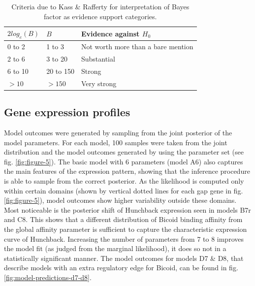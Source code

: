 \begin{table}[h]
\centering
\begin{tabular}{lll}
\hline
$2log_{e}(B)$ & $B$ & Evidence against $H_0$ \\ \hline
0 to 2 & 1 to 3 & Not worth more than a bare mention \\
2 to 6 & 3 to 20 & Substantial                      \\
6 to 10 & 20 to 150 & Strong                      \\
$> 10$ & $> 150$ & Very strong                      \\ \hline
\end{tabular}
\vspace{0.25in}
\caption{Criteria due to Kass \& Rafferty \cite{raftery95} for interpretation of Bayes factor as evidence support categories.}
\label{table2}
\end{table}

\subsection{Gene expression profiles}
Model outcomes were generated by sampling from the joint posterior of the model parameters. For each model, 100 samples were taken from the joint distribution and the model outcomes generated by using the parameter set (see fig. \ref{fig:figure-5}). The basic model with 6 parameters (model A6) also captures the main features of the expression pattern, showing that the inference procedure is able to sample from the correct posterior. As the likelihood is computed only within certain domains (shown by vertical dotted lines for each gap gene in fig. \ref{fig:figure-5}), model outcomes show higher variability outside these domains. Most noticeable is the posterior shift of Hunchback expression seen in models B7r and C8. This shows that a different distribution of Bicoid binding affinity from the global affinity parameter is sufficient to capture the characteristic expression curve of Hunchback. Increasing the number of parameters from 7 to 8 improves the model fit (as judged from the marginal likelihood), it does so not in a statistically significant manner. The model outcomes for models D7 \& D8, that describe models with an extra regulatory edge for Bicoid, can be found in fig. \ref{fig:model-predictions-d7-d8}. 

